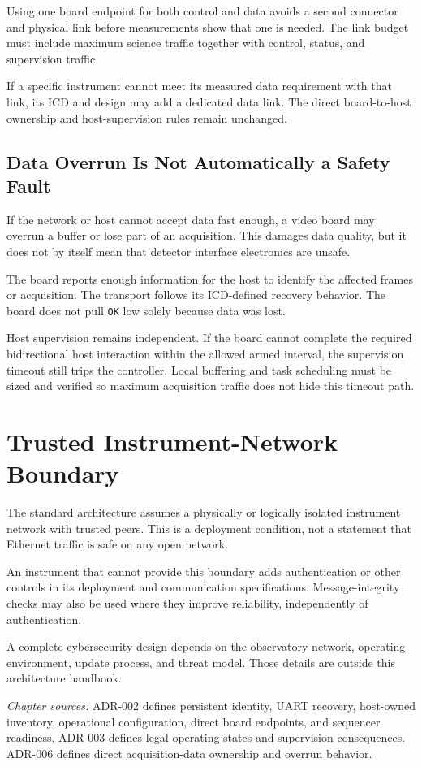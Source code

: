 Using one board endpoint for both control and data avoids a second connector and physical link before measurements show that one is needed. The link budget must include maximum science traffic together with control, status, and supervision traffic.

If a specific instrument cannot meet its measured data requirement with that link, its ICD and design may add a dedicated data link. The direct board-to-host ownership and host-supervision rules remain unchanged.

\subsection{Data Overrun Is Not Automatically a Safety Fault}

If the network or host cannot accept data fast enough, a video board may overrun a buffer or lose part of an acquisition. This damages data quality, but it does not by itself mean that detector interface electronics are unsafe.

The board reports enough information for the host to identify the affected frames or acquisition. The transport follows its ICD-defined recovery behavior. The board does not pull \texttt{OK} low solely because data was lost.

Host supervision remains independent. If the board cannot complete the required bidirectional host interaction within the allowed armed interval, the supervision timeout still trips the controller. Local buffering and task scheduling must be sized and verified so maximum acquisition traffic does not hide this timeout path.

\section{Trusted Instrument-Network Boundary}

The standard architecture assumes a physically or logically isolated instrument network with trusted peers. This is a deployment condition, not a statement that Ethernet traffic is safe on any open network.

An instrument that cannot provide this boundary adds authentication or other controls in its deployment and communication specifications. Message-integrity checks may also be used where they improve reliability, independently of authentication.

A complete cybersecurity design depends on the observatory network, operating environment, update process, and threat model. Those details are outside this architecture handbook.

\medskip
\noindent\textit{Chapter sources:} ADR-002 defines persistent identity, UART recovery, host-owned inventory, operational configuration, direct board endpoints, and sequencer readiness. ADR-003 defines legal operating states and supervision consequences. ADR-006 defines direct acquisition-data ownership and overrun behavior.

